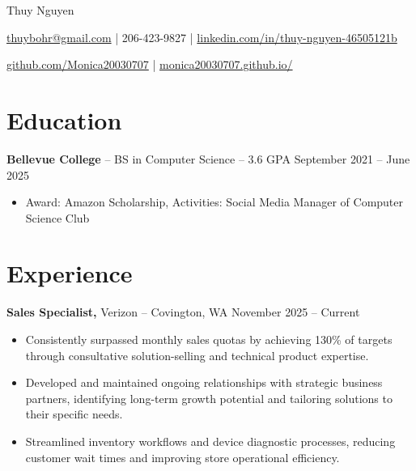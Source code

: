 \documentclass[11pt]{article}       %
\begin{document}
\centerline{\Huge Thuy Nguyen}

\vspace{5pt}

\centerline{\href{mailto:thuybohr@gmail.com}{thuybohr@gmail.com} | 206-423-9827 |
\href{https://www.linkedin.com/in/thuy-nguyen-46505121b/}{linkedin.com/in/thuy-nguyen-46505121b}}

\centerline{\href{https://github.com/Monica20030707}{github.com/Monica20030707} | 
\href{https://monica20030707.github.io/}{monica20030707.github.io/}} 

\vspace{-9pt}

\section*{Education}
\textbf{Bellevue College} -- BS in Computer Science -- 3.6 GPA \hfill September 2021 -- June 2025\\
\vspace{-9pt}
\begin{itemize}
  \item Award: Amazon Scholarship, Activities: Social Media Manager of Computer Science Club
\end{itemize}

\vspace{-18.5pt}

\section*{Experience}

\textbf{Sales Specialist,} {Verizon} -- Covington, WA \hfill November 2025 -- Current \\
\vspace{-9pt}
\begin{itemize}
  \item Consistently surpassed monthly sales quotas by achieving 130\% of targets through consultative solution-selling and technical product expertise.
  \item Developed and maintained ongoing relationships with strategic business partners, identifying long-term growth potential and tailoring solutions to their specific needs.
  \item Streamlined inventory workflows and device diagnostic processes, reducing customer wait times and improving store operational efficiency.
\end{itemize}
\end{document}
